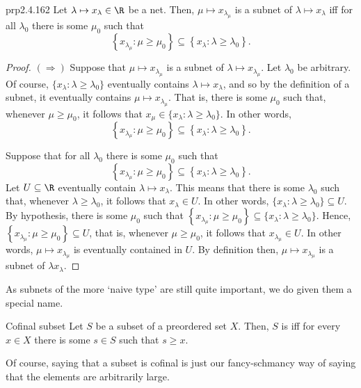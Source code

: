 \begin{prp}{}{prp2.4.162}
Let $\lambda \mapsto x_{\lambda}\in \R$ be a net.  Then, $\mu \mapsto x_{\lambda _{\mu}}$ is a subnet of $\lambda \mapsto x_{\lambda}$ iff for all $\lambda _0$ there is some $\mu _0$ such that
\begin{equation}
\left\{ x_{\lambda _{\mu}}:\mu \geq \mu _0\right\} \subseteq \left\{ x_{\lambda}:\lambda \geq \lambda _0\right\} .
\end{equation}
\begin{proof}
$(\Rightarrow )$ Suppose that $\mu \mapsto x_{\lambda _{\mu}}$ is a subnet of $\lambda \mapsto x_{\lambda _{\mu}}$.  Let $\lambda _0$ be arbitrary.  Of course, $\{ x_{\lambda}:\lambda \geq \lambda _0\}$ eventually contains $\lambda \mapsto x_{\lambda}$, and so by the definition of a subnet, it eventually contains $\mu \mapsto x_{\lambda _{\mu}}$.  That is, there is some $\mu _0$ such that, whenever $\mu \geq \mu _0$, it follows that $x_{\mu}\in \{ x_{\lambda}:\lambda \geq \lambda _0\}$.  In other words,
\begin{equation}
\left\{ x_{\lambda _{\mu}}:\mu \geq \mu _0\right\} \subseteq \left\{ x_{\lambda}:\lambda \geq \lambda _0\right\} .
\end{equation}

\blankline
\noindent
Suppose that for all $\lambda _0$ there is some $\mu _0$ such that
\begin{equation}
\left\{ x_{\lambda _{\mu}}:\mu \geq \mu _0\right\} \subseteq \left\{ x_{\lambda}:\lambda \geq \lambda _0\right\} .
\end{equation}
Let $U\subseteq \R$ eventually contain $\lambda \mapsto x_{\lambda}$.  This means that there is some $\lambda _0$ such that, whenever $\lambda \geq \lambda _0$, it follows that $x_{\lambda}\in U$.  In other words, $\{ x_{\lambda}:\lambda \geq \lambda _0\} \subseteq U$.  By hypothesis, there is some $\mu _0$ such that $\left\{ x_{\lambda _{\mu}}:\mu \geq \mu _0\right\} \subseteq \{ x_{\lambda}:\lambda \geq \lambda _0\}$.  Hence, $\left\{ x_{\lambda _{\mu}}:\mu \geq \mu _0\right\} \subseteq U$, that is, whenever $\mu \geq \mu _0$, it follows that $x_{\lambda _{\mu}}\in U$.  In other words, $\mu \mapsto x_{\lambda _{\mu}}$ is eventually contained in $U$.  By definition then, $\mu \mapsto x_{\lambda _{\mu}}$ is a subnet of $\lambda x_{\lambda}$.
\end{proof}
\end{prp}
As subnets of the more `naive type' are still quite important, we do given them a special name.
\begin{dfn}{Cofinal subset}{}
Let $S$ be a subset of a preordered set $X$.  Then, $S$ is  iff for every $x\in X$ there is some $s\in S$ such that $s\geq x$.
\begin{rmk}
Of course, saying that a subset is cofinal is just our fancy-schmancy way of saying that the elements are arbitrarily large.
\end{rmk}
\end{dfn}
